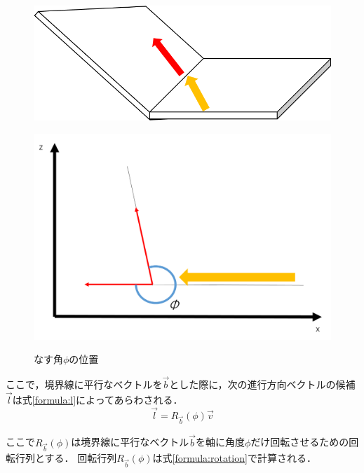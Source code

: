 \documentclass[a4paper,11pt]{jarticle}
\begin{document}
	\begin{figure}
		\begin{minipage}{0.5\linewidth}
			\centering
			\includegraphics[width=1\linewidth]{png/sub.png}
			\label{fig:phi}
		\end{minipage}
		\begin{minipage}{0.5\linewidth}
			\centering
			\includegraphics[width=1\linewidth]{png/rotation.png}
			\label{fig:xz}
		\end{minipage}
		\caption{なす角$\phi$の位置}
		\label{fig:rotation}
	\end{figure}
	
	ここで，境界線に平行なベクトルを$\vec{b} $とした際に，次の進行方向ベクトルの候補$\vec{l}$は式\ref{formula:l}によってあらわされる．
	\begin{equation}
	\label{formula:l}
	\vec{l} = R_{\vec{b}}(\phi)\vec{v}
	\end{equation}
	
	ここで$R_{\vec{b}}(\phi)$は境界線に平行なベクトル$\vec{b}$を軸に角度$\phi$だけ回転させるための回転行列とする．
	回転行列$R_{\vec{b}}(\phi)$は式\ref{formula:rotation}で計算される．
	
\end{document}

